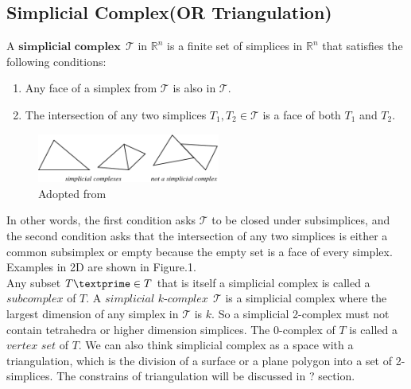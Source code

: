\subsection{Simplicial Complex(OR Triangulation)}
    \begin{definition*}
    A $\textbf{simplicial complex} ~~\mathcal T$ in $\mathbb{R}^n$ is a finite set of simplices in $\mathbb{R}^n$ that satisfies the following conditions:
    \begin{enumerate}[label =\arabic*.]
      \item Any face of a simplex from $\mathcal{T}$ is also in $\mathcal{T}$.
      \item The intersection of any two simplices ${T}_1, {T}_2 \in \mathcal{T}$ is a face of both ${T}_1$ and  ${T}_2$.
    \end{enumerate}
    \begin{figure}[b]
    \centering
    \includegraphics[width=60mm]{SimplicialComplex}
    \caption[Simplicial Complex Example and Counterexample]{Adopted from~\cite{WEBSITE:1}}%
    \label{Fig2}
    \end{figure}
    \end{definition*}
    In other words, the first condition asks $\mathcal{T}$ to be closed under subsimplices, and the second condition asks that the intersection of any two simplices is either a common subsimplex or empty because the empty set is a face of every simplex. Examples in 2D are shown in Figure.1. \\
    \indent
    Any subset ${T\textprime}\in{T}$ that is itself a simplicial complex is called a $\textit{subcomplex}$ of ${T}$. A $\textit{simplicial k-complex} ~~\mathcal T$ is a simplicial complex where the largest dimension of any simplex in $\mathcal T$ is ${k}$. So a simplicial 2-complex must not contain tetrahedra or higher dimension simplices. The 0-complex of ${T}$ is called a $\textit{vertex set}$ of ${T}$. We can also think simplicial complex as a space with a triangulation, which is the division of a surface or a plane polygon into a set of 2-simplices. The constrains of triangulation will be discussed in ? section.\\

